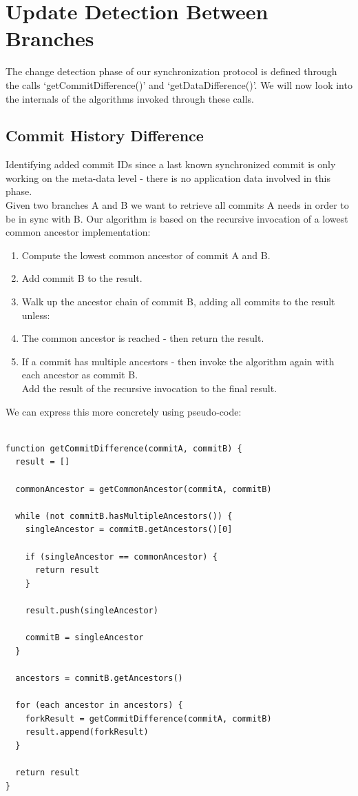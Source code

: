 
\section{Update Detection Between Branches}
\label{main.diff-across-commits}

The change detection phase of our synchronization protocol is defined through the calls `getCommitDifference()' and `getDataDifference()'.
We will now look into the internals of the algorithms invoked through these calls.\\

\subsection{Commit History Difference}
Identifying added commit IDs since a last known synchronized commit is only working on the meta-data level - there is no application data involved in this phase.\\
Given two branches A and B we want to retrieve all commits A needs in order to be in sync with B.
Our algorithm is based on the recursive invocation of a lowest common ancestor implementation:\\

\begin{enumerate}
\item Compute the lowest common ancestor of commit A and B.
\item Add commit B to the result.
\item Walk up the ancestor chain of commit B, adding all commits to the result unless:
\item The common ancestor is reached - then return the result.
\item If a commit has multiple ancestors - then invoke the algorithm again with each ancestor as commit B.\\
Add the result of the recursive invocation to the final result.
\end{enumerate}

We can express this more concretely using pseudo-code:\\

\begin{lstlisting}[caption=Detecting commit history difference, label=commit-difference]

function getCommitDifference(commitA, commitB) {
  result = []

  commonAncestor = getCommonAncestor(commitA, commitB)

  while (not commitB.hasMultipleAncestors()) {
    singleAncestor = commitB.getAncestors()[0]

    if (singleAncestor == commonAncestor) {
      return result
    }

    result.push(singleAncestor)

    commitB = singleAncestor
  }

  ancestors = commitB.getAncestors()

  for (each ancestor in ancestors) {
    forkResult = getCommitDifference(commitA, commitB)
    result.append(forkResult)
  }

  return result
}

\end{lstlisting}

